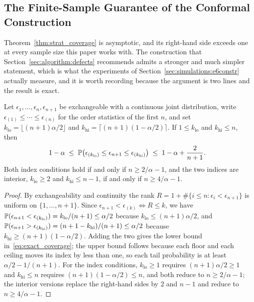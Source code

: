 \subsection{The Finite-Sample Guarantee of the Conformal Construction}
\label{sec:theory:finite}

Theorem~\ref{thm:strat_coverage} is asymptotic, and its right-hand side
exceeds one at every sample size this paper works with.  The
construction that Section~\ref{sec:algorithm:defects} recommends admits
a stronger and much simpler statement, which is what the experiments of
Section~\ref{sec:simulations:e6constr} actually measure, and it is
worth recording because the argument is two lines and the result is
exact.

\begin{proposition}
\label{prop:finite_sample}
Let $\epsilon_1, \ldots, \epsilon_{n}, \epsilon_{n+1}$ be exchangeable
with a continuous joint distribution, write
$\epsilon_{(1)} \leq \cdots \leq \epsilon_{(n)}$ for the order
statistics of the first $n$, and set
$k_{\text{lo}} = \lfloor (n+1)\alpha/2 \rfloor$ and
$k_{\text{hi}} = \lceil (n+1)(1-\alpha/2) \rceil$.  If
$1 \leq k_{\text{lo}}$ and $k_{\text{hi}} \leq n$, then
\begin{equation}
  \label{eq:exact_coverage}
  1 - \alpha
  \;\leq\;
  \mathbb{P}\bigl(\epsilon_{(k_{\text{lo}})} \leq \epsilon_{n+1}
             \leq \epsilon_{(k_{\text{hi}})}\bigr)
  \;\leq\;
  1 - \alpha + \frac{2}{n+1}.
\end{equation}
Both index conditions hold if and only if $n \geq 2/\alpha - 1$, and
the two indices are interior, $k_{\text{lo}} \geq 2$ and
$k_{\text{hi}} \leq n-1$, if and only if $n \geq 4/\alpha - 1$.
\end{proposition}

\begin{proof}
By exchangeability and continuity the rank
$R = 1 + \#\{i \leq n : \epsilon_i < \epsilon_{n+1}\}$ is uniform on
$\{1,\ldots,n+1\}$.  Since
$\epsilon_{n+1} < \epsilon_{(k)} \iff R \leq k$, we have
$\mathbb{P}(\epsilon_{n+1} < \epsilon_{(k_{\text{lo}})})
= k_{\text{lo}}/(n+1) \leq \alpha/2$ because
$k_{\text{lo}} \leq (n+1)\alpha/2$, and
$\mathbb{P}(\epsilon_{n+1} > \epsilon_{(k_{\text{hi}})})
= (n+1-k_{\text{hi}})/(n+1) \leq \alpha/2$ because
$k_{\text{hi}} \geq (n+1)(1-\alpha/2)$.  Adding the two gives the lower
bound in~\eqref{eq:exact_coverage}; the upper bound follows because
each floor and each ceiling moves its index by less than one, so each
tail probability is at least $\alpha/2 - 1/(n+1)$.  For the index
conditions, $k_{\text{lo}} \geq 1$ requires
$(n+1)\alpha/2 \geq 1$ and $k_{\text{hi}} \leq n$ requires
$(n+1)(1-\alpha/2) \leq n$, and both reduce to
$n \geq 2/\alpha - 1$; the interior versions replace the right-hand
sides by $2$ and $n-1$ and reduce to $n \geq 4/\alpha - 1$.
\end{proof}

